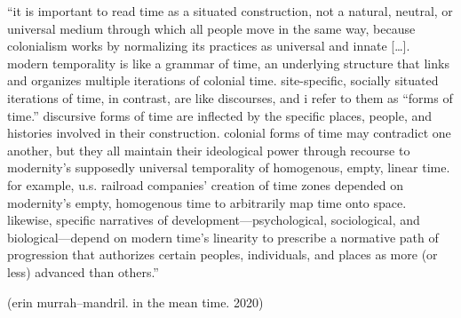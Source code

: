 \documentclass[12pt,a4paper,british,landscape]{article}
\begin{document}
{\fontsize{0.915cm}{1cm}\selectfont

``it is important to read time as a situated construction, not a natural, neutral, or universal medium through which all people move in the same way, because colonialism works by normalizing its practices as universal and innate [\dots].
modern temporality is like a grammar of time, an underlying structure that links and organizes multiple iterations of colonial time.
site-specific, socially situated iterations of time, in contrast, are like discourses, and i refer to them as “forms of time.”
discursive forms of time are inflected by the specific places, people, and histories involved in their construction.
colonial forms of time may contradict one another, but they all maintain their ideological power through recourse to modernity’s supposedly universal temporality of homogenous, empty, linear time.
for example, u.s. railroad companies’ creation of time zones depended on modernity’s empty, homogenous time to arbitrarily map time onto space.
likewise, specific narratives of development—psychological, sociological, and biological—depend on modern time’s linearity to prescribe a normative path of progression that authorizes certain peoples, individuals, and places as more (or less) advanced than others.''

\vspace{0.25cm}

\begin{center}
(erin murrah--mandril. in the mean time. 2020)
\end{center}

}
\end{document}
